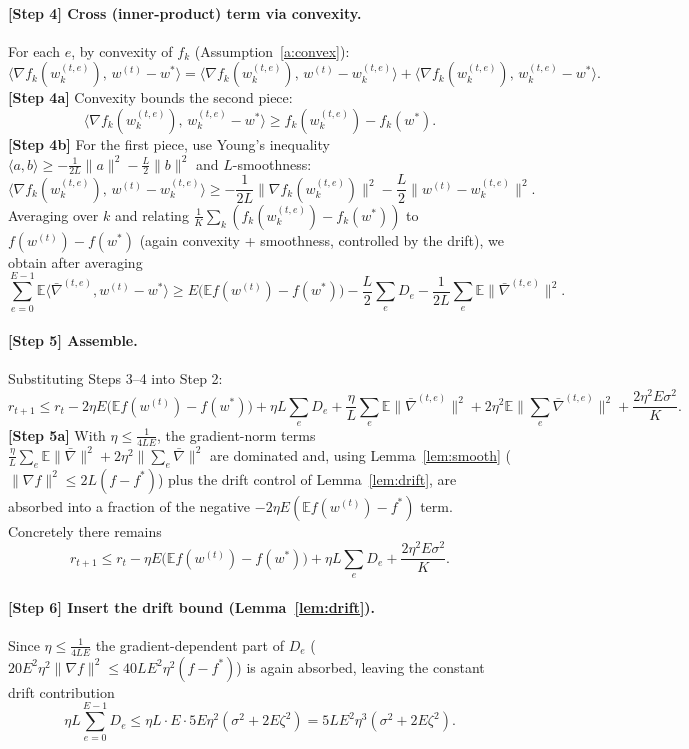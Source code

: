 \documentclass[11pt]{article}
\begin{document}
\paragraph{[Step 4] Cross (inner-product) term via convexity.}
For each $e$, by convexity of $f_k$ (Assumption~\ref{a:convex}):
\[
\langle \nabla f_k(w_k^{(t,e)}),\, w^{(t)} - w^* \rangle
= \langle \nabla f_k(w_k^{(t,e)}),\, w^{(t)} - w_k^{(t,e)} \rangle
+ \langle \nabla f_k(w_k^{(t,e)}),\, w_k^{(t,e)} - w^* \rangle .
\]
\textbf{[Step 4a]} Convexity bounds the second piece:
\[
\langle \nabla f_k(w_k^{(t,e)}),\, w_k^{(t,e)} - w^* \rangle
\ge f_k(w_k^{(t,e)}) - f_k(w^*).
\]
\textbf{[Step 4b]} For the first piece, use Young's inequality
$\langle a,b\rangle \ge -\frac{1}{2L}\|a\|^2 - \frac{L}{2}\|b\|^2$ and $L$-smoothness:
\[
\langle \nabla f_k(w_k^{(t,e)}),\, w^{(t)} - w_k^{(t,e)} \rangle
\ge -\frac{1}{2L}\|\nabla f_k(w_k^{(t,e)})\|^2 - \frac{L}{2}\|w^{(t)}-w_k^{(t,e)}\|^2 .
\]
Averaging over $k$ and relating $\frac1K\sum_k(f_k(w_k^{(t,e)})-f_k(w^*))$ to
$f(w^{(t)})-f(w^*)$ (again convexity + smoothness, controlled by the drift),
we obtain after averaging
\[
\sum_{e=0}^{E-1}\mathbb{E}\big\langle \bar\nabla^{(t,e)}, w^{(t)}-w^*\big\rangle
\ge E\big(\mathbb{E}f(w^{(t)})-f(w^*)\big)
- \frac{L}{2}\sum_{e}D_e
- \frac{1}{2L}\sum_e \mathbb{E}\|\bar\nabla^{(t,e)}\|^2 .
\]

\paragraph{[Step 5] Assemble.}
Substituting Steps 3--4 into Step 2:
\[
r_{t+1} \le r_t
- 2\eta E\big(\mathbb{E}f(w^{(t)}) - f(w^*)\big)
+ \eta L \sum_e D_e
+ \frac{\eta}{L}\sum_e \mathbb{E}\|\bar\nabla^{(t,e)}\|^2
+ 2\eta^2\mathbb{E}\Big\|\sum_e \bar\nabla^{(t,e)}\Big\|^2
+ \frac{2\eta^2 E\sigma^2}{K}.
\]
\textbf{[Step 5a]} With $\eta \le \frac{1}{4LE}$, the gradient-norm terms
$\frac{\eta}{L}\sum_e\mathbb{E}\|\bar\nabla\|^2 + 2\eta^2\|\sum_e\bar\nabla\|^2$
are dominated and, using Lemma~\ref{lem:smooth}
($\|\nabla f\|^2 \le 2L(f-f^*)$) plus the drift control of Lemma~\ref{lem:drift},
are absorbed into a fraction of the negative $-2\eta E(\mathbb{E}f(w^{(t)})-f^*)$ term.
Concretely there remains
\[
r_{t+1} \le r_t
- \eta E\big(\mathbb{E}f(w^{(t)}) - f(w^*)\big)
+ \eta L \sum_e D_e
+ \frac{2\eta^2 E\sigma^2}{K}.
\]

\paragraph{[Step 6] Insert the drift bound (Lemma~\ref{lem:drift}).}
Since $\eta\le\frac{1}{4LE}$ the gradient-dependent part of $D_e$
($20E^2\eta^2\|\nabla f\|^2 \le 40 LE^2\eta^2(f-f^*)$) is again absorbed,
leaving the constant drift contribution
\[
\eta L \sum_{e=0}^{E-1} D_e
\le \eta L \cdot E \cdot 5E\eta^2(\sigma^2 + 2E\zeta^2)
= 5LE^2\eta^3(\sigma^2 + 2E\zeta^2).
\]
\end{document}
